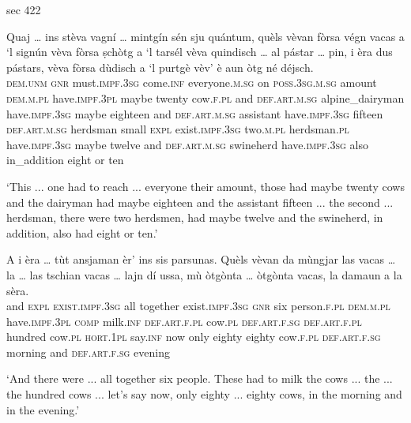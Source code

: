 sec 422

\begin{linenumbers}
	\gll Quaj … ins stèva vagní … mintgín sén sju quántum, quèls vèvan fòrsa végn vacas a `l signún vèva fòrsa ṣchòtg a `l tarsél vèva quindisch … al pástar … pin, i èra dus pástars, vèva fòrsa dùdisch a `l purtgè vèv’ è aun òtg né déjsch.   \\
	\textsc{dem.unm} {} \textsc{gnr} must.\textsc{impf.3sg} come.\textsc{inf} {} everyone.\textsc{m.sg} on \textsc{poss.3sg.m.sg} amount \textsc{dem.m.pl} have.\textsc{impf.3pl} maybe twenty cow.\textsc{f.pl} and \textsc{def.art.m.sg} alpine\_dairyman have.\textsc{impf.3sg} maybe eighteen and \textsc{def.art.m.sg} assistant have.\textsc{impf.3sg} fifteen {} \textsc{def.art.m.sg} herdsman {} small \textsc{expl} exist.\textsc{impf.3sg} two.\textsc{m.pl} herdsman.\textsc{pl} have.\textsc{impf.3sg} maybe twelve and \textsc{def.art.m.sg} swineherd have.\textsc{impf.3sg} also in\_addition eight or ten\\
\end{linenumbers}
\medskip
\glt `This ... one had to reach ... everyone their amount, those had maybe twenty cows and the dairyman had maybe eighteen and the assistant fifteen ... the second ... herdsman, there were two herdsmen, had maybe twelve and the swineherd, in addition, also had eight or ten.'
\medskip

\begin{linenumbers}
	\gll   A i èra … tùt ansjaman èr’ ins sis parsunas. Quèls vèvan da mùngjar las vacas … la … las tschian vacas … lajn dí ussa, mù òtgònta … òtgònta vacas, la damaun a la sèra. \\
	and \textsc{expl} \textsc{exist.impf.3sg} {} all together exist.\textsc{impf.3sg} \textsc{gnr} six person.\textsc{f.pl} \textsc{dem.m.pl} have.\textsc{impf.3pl} \textsc{comp} milk.\textsc{inf} \textsc{def.art.f.pl} cow.\textsc{pl} {} \textsc{def.art.f.sg} {} \textsc{def.art.f.pl} hundred cow.\textsc{pl} {}  \textsc{hort.1pl} say.\textsc{inf} now only eighty {} eighty cow.\textsc{f.pl} \textsc{def.art.f.sg} morning and \textsc{def.art.f.sg} evening\\
\end{linenumbers}
\medskip
\glt `And there were ... all together six people. These had to milk the cows ... the ... the hundred cows ... let's say now, only eighty ... eighty cows, in the morning and in the evening.'
\medskip

